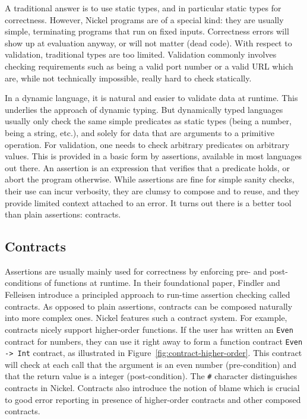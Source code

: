 \documentclass[sigplan,10pt,review,anonymous]{acmart}
\newcommand{\nickel}[1]{\lstinline[language=nickel]{#1}}
\begin{document}
A traditional answer is to use static types, and in particular static types for
correctness. However, Nickel programs are of a special kind: they are usually
simple, terminating programs that run on fixed inputs. Correctness errors will
show up at evaluation anyway, or will not matter (dead code). With respect to
validation, traditional types are too limited. Validation commonly involves
checking requirements such as being a valid port number or a valid URL which
are, while not technically impossible, really hard to check statically.

In a dynamic language, it is natural and easier to validate data at runtime.
This underlies the approach of dynamic typing. But dynamically typed languages
usually only check the same simple predicates as static types (being a number,
being a string, etc.), and solely for data that are arguments to a primitive
operation. For validation, one needs to check arbitrary predicates on arbitrary
values. This is provided in a basic form by assertions, available in most
languages out there. An assertion is an expression that verifies that a
predicate holds, or abort the program otherwise.  While assertions are fine for
simple sanity checks, their use can incur verbosity, they are clumsy to compose
and to reuse, and they provide limited context attached to an error. It turns
out there is a better tool than plain assertions: contracts.

\subsection*{Contracts}

Assertions are usually mainly used for correctness by enforcing pre- and
post-conditions of functions at runtime. In their foundational
paper\cite{FindlerFelleisenHOContracts}, Findler and Felleisen introduce a
principled approach to run-time assertion checking called contracts. As opposed
to plain assertions, contracts can be composed naturally into more complex ones.
Nickel features such a contract system. For example, contracts nicely support
higher-order functions. If the user has written an \nickel{Even} contract for
numbers, they can use it right away to form a function contract \nickel{Even ->
Int} contract, as illustrated in Figure~\ref{fig:contract-higher-order}. This
contract will check at each call that the argument is an even number
(pre-condition) and that the return value is a integer (post-condition). The
\nickel{#} character distinguishes contracts in Nickel. Contracts also introduce
the notion of blame which is crucial to good error reporting in presence of
higher-order contracts and other composed contracts.
\end{document}
